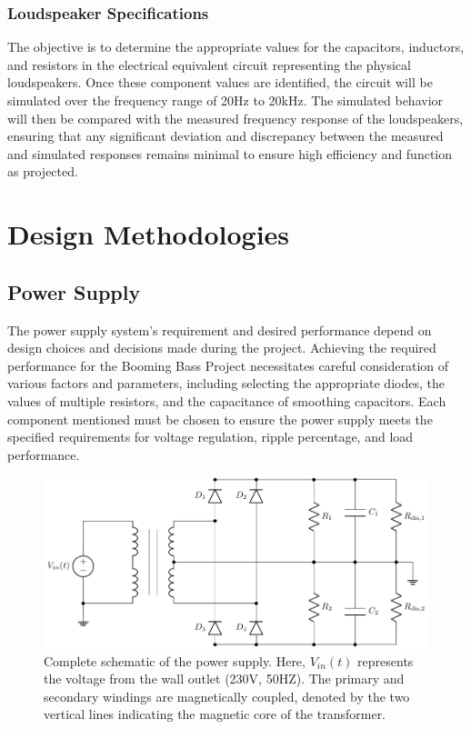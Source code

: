 \subsubsection{Loudspeaker Specifications}
The objective is to determine the appropriate values for the capacitors, inductors, and resistors in the electrical equivalent circuit representing the physical loudspeakers. Once these component values are identified, the circuit will be simulated over the frequency range of 20Hz to 20kHz. The simulated behavior will then be compared with the measured frequency response of the loudspeakers, ensuring that any significant deviation and discrepancy between the measured and simulated responses remains minimal to ensure high efficiency and function as projected.



\newpage
\section{Design Methodologies}
\subsection{Power Supply}
The power supply system's requirement and desired performance depend on design choices and decisions made during the project. Achieving the required performance for the Booming Bass Project necessitates careful consideration of various factors and parameters, including selecting the appropriate diodes, the values of multiple resistors, and the capacitance of smoothing capacitors. Each component mentioned must be chosen to ensure the power supply meets the specified requirements for voltage regulation, ripple percentage, and load performance. 
\begin{figure}[H]
    \centering
    \captionsetup{justification=raggedright, labelfont=bf}
    \includegraphics[width=0.75\linewidth]{TU Delft Booming Bass Project Report/figures/PowerSupply/MainPowerSupply.pdf}
    \caption{{Complete schematic of the power supply. Here, $V_{in}(t)$ represents the voltage from the wall outlet (230V, 50HZ). The primary and secondary windings are magnetically coupled, denoted by the two vertical lines indicating the magnetic core of the transformer.}}
    \label{fig:MainPowerSupplySchematic}
\end{figure}
\vspace{10pt}

